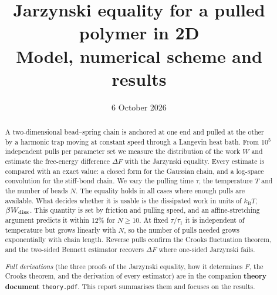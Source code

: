 \documentclass[11pt,a4paper]{article}
\title{Jarzynski equality for a pulled polymer in 2D\\[0.3em]
\large Model, numerical scheme and results}
\author{}
\date{6 October 2026}
\newcommand{\kT}{k_{\mathrm B}T}
\newcommand{\Wd}{W_{\rm diss}}
\begin{document}
\maketitle

\begin{abstract}
A two-dimensional bead--spring chain is anchored at one end and pulled at the other by a
harmonic trap moving at constant speed through a Langevin heat bath. From $10^5$ independent
pulls per parameter set we measure the distribution of the work $W$ and estimate the
free-energy difference $\Delta F$ with the Jarzynski equality. Every estimate is compared
with an exact value: a closed form for the Gaussian chain, and a log-space convolution for
the stiff-bond chain. We vary the pulling time $\tau$, the temperature $T$ and the number of
beads $N$. The equality holds in all cases where enough pulls are available. What decides
whether it is usable is the dissipated work in units of $\kT$, $\beta\Wd$. This quantity is
set by friction and pulling speed, and an affine-stretching argument predicts it within
$12\%$ for $N\ge10$. At fixed $\tau/\tau_1$ it is independent of temperature but grows linearly with $N$,
so the number of pulls needed grows exponentially with chain length. Reverse pulls confirm the
Crooks fluctuation theorem, and the two-sided Bennett estimator recovers $\Delta F$ where
one-sided Jarzynski fails.

\smallskip\noindent\emph{Full derivations} (the three proofs of the Jarzynski equality, how it
determines $F$, the Crooks theorem, and the derivation of every estimator) are in the companion
\textbf{theory document} \texttt{theory.pdf}. This report summarises them and focuses on the results.
\end{abstract}
\end{document}
